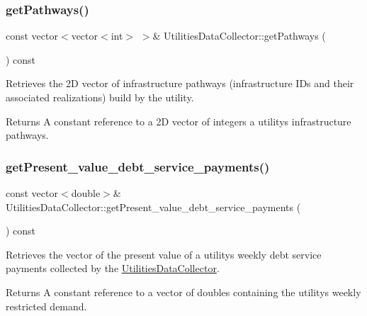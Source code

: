 \subsubsection{\texorpdfstring{get\+Pathways()}{getPathways()}}
{\footnotesize\ttfamily const vector$<$vector$<$int$>$ $>$\& Utilities\+Data\+Collector\+::get\+Pathways (\begin{DoxyParamCaption}{ }\end{DoxyParamCaption}) const}



Retrieves the 2D vector of infrastructure pathways (infrastructure I\+Ds and their associated realizations) build by the utility. 

\begin{DoxyReturn}{Returns}
A constant reference to a 2D vector of integers a utility\textquotesingle{}s infrastructure pathways. 
\end{DoxyReturn}
\mbox{\label{classUtilitiesDataCollector_afdfabc1bf2b9b2f8639744afeaa76e11}} 
\subsubsection{\texorpdfstring{get\+Present\+\_\+value\+\_\+debt\+\_\+service\+\_\+payments()}{getPresent\_value\_debt\_service\_payments()}}
{\footnotesize\ttfamily const vector$<$double$>$\& Utilities\+Data\+Collector\+::get\+Present\+\_\+value\+\_\+debt\+\_\+service\+\_\+payments (\begin{DoxyParamCaption}{ }\end{DoxyParamCaption}) const}



Retrieves the vector of the present value of a utility\textquotesingle{}s weekly debt service payments collected by the {\ttfamily \mbox{\hyperlink{classUtilitiesDataCollector}{Utilities\+Data\+Collector}}}. 

\begin{DoxyReturn}{Returns}
A constant reference to a vector of doubles containing the utility\textquotesingle{}s weekly restricted demand. 
\end{DoxyReturn}
\mbox{\label{classUtilitiesDataCollector_a04b4760bce9c615d450d84cc27126ef7}} 
